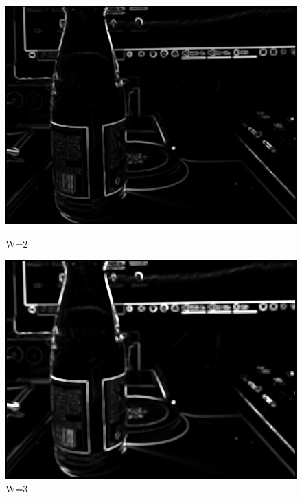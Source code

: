 \documentclass[11pt]{jarticle}
\begin{document}
\begin{figure}[t]
    \begin{minipage}{0.5\hsize}
        \centering
        \includegraphics[scale=.3]{w2.jpg}
        \caption{W=2}
    \end{minipage}
    \begin{minipage}{0.5\hsize}
        \centering
        \includegraphics[scale=.3]{w3.jpg}
        \caption{W=3}
    \end{minipage}
\end{figure}
\end{document}
